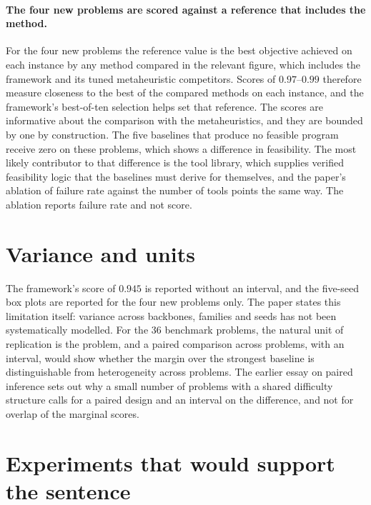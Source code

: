 \documentclass[11pt]{article}
\theoremstyle{definition}
\begin{document}
\paragraph{The four new problems are scored against a reference that includes the method.} For the four new problems the reference value is the best objective achieved on each instance by any method compared in the relevant figure, which includes the framework and its tuned metaheuristic competitors. Scores of $0.97$--$0.99$ therefore measure closeness to the best of the compared methods on each instance, and the framework's best-of-ten selection helps set that reference. The scores are informative about the comparison with the metaheuristics, and they are bounded by one by construction. The five baselines that produce no feasible program receive zero on these problems, which shows a difference in feasibility. The most likely contributor to that difference is the tool library, which supplies verified feasibility logic that the baselines must derive for themselves, and the paper's ablation of failure rate against the number of tools points the same way. The ablation reports failure rate and not score.

\section{Variance and units}

The framework's score of $0.945$ is reported without an interval, and the five-seed box plots are reported for the four new problems only. The paper states this limitation itself: variance across backbones, families and seeds has not been systematically modelled. For the 36 benchmark problems, the natural unit of replication is the problem, and a paired comparison across problems, with an interval, would show whether the margin over the strongest baseline is distinguishable from heterogeneity across problems. The earlier essay on paired inference sets out why a small number of problems with a shared difficulty structure calls for a paired design and an interval on the difference, and not for overlap of the marginal scores.

\section{Experiments that would support the sentence}
\end{document}
